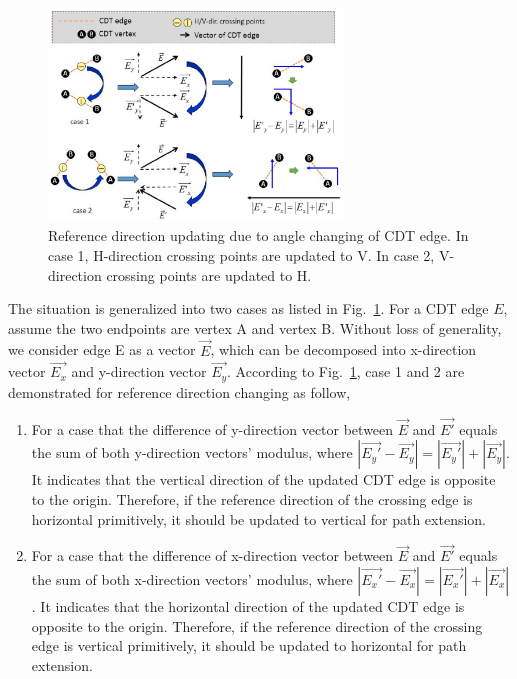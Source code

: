        
      \begin{figure}[t]
        \begin{center}
          \includegraphics[width=0.7\textwidth]{Fig/Chapter4/refdir2.eps}
          \caption{Reference direction updating due to angle changing of CDT edge.
           In case 1, H-direction crossing points are updated to V. 
             In case 2, V-direction crossing points are updated to H.}
          \label{fig:refdir}
        \end{center}
      \end{figure}

      The situation is generalized into two cases as listed in Fig.~\ref{fig:refdir}.
      For a CDT edge $E$, assume the two endpoints are vertex A and vertex B. Without loss of generality, we consider edge E as a vector $\overrightarrow{E}$, which can be decomposed into x-direction vector $\overrightarrow{E_x}$ and y-direction vector $\overrightarrow{E_y}$. According to Fig.~\ref{fig:refdir}, case 1 and 2 are demonstrated for reference direction changing as follow, 


      \begin{enumerate}
        \item For a case that the difference of y-direction vector between $\overrightarrow{E}$ and $\overrightarrow{E'}$ equals the sum of both y-direction vectors' modulus, where $|\overrightarrow{E_y'} - \overrightarrow{E_y}|=|\overrightarrow{E_y'}|+|\overrightarrow{E_y}|$. It indicates that the vertical direction of the updated CDT edge is opposite to the origin. Therefore, if the reference direction of the crossing edge is horizontal primitively, it should be updated to vertical for path extension.
        \item For a case that the difference of x-direction vector between $\overrightarrow{E}$ and $\overrightarrow{E'}$ equals the sum of both x-direction vectors' modulus, where $|\overrightarrow{E_x'} - \overrightarrow{E_x}|=|\overrightarrow{E_x'}|+|\overrightarrow{E_x}|$. It indicates that the horizontal direction of the updated CDT edge is opposite to the origin. Therefore, if the reference direction of the crossing edge is vertical primitively, it should be updated to horizontal for path extension.
      \end{enumerate}

